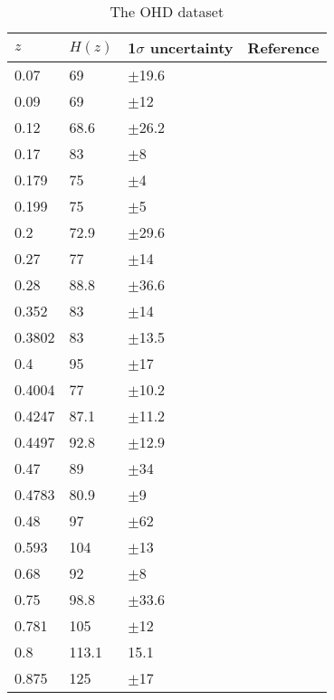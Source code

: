 \documentclass{aa}
\begin{document}
   \begin{table}[htbp]
      \caption{The OHD dataset}
      \centering
      \begin{tabular}{llll}
         \hline\hline
         $z$ & $H(z)$ & 1$\sigma$ uncertainty & Reference \\
         \hline     
         0.07 & 69 & $\pm$19.6 & \cite{Zhang_2014} \\
         0.09 & 69 & $\pm$12 & \cite{PhysRevD.71.123001} \\
         0.12 & 68.6 & $\pm$26.2 & \cite{Zhang_2014} \\
         0.17 & 83 & $\pm$8 & \cite{PhysRevD.71.123001} \\
         0.179 & 75 & $\pm$4 & \cite{M.Moresco_2012} \\
         0.199 & 75 & $\pm$5 & \cite{M.Moresco_2012} \\
         0.2 & 72.9 & $\pm$29.6 & \cite{Zhang_2014} \\
         0.27 & 77 & $\pm$14 & \cite{PhysRevD.71.123001} \\
         0.28 & 88.8 & $\pm$36.6 & \cite{Zhang_2014} \\
         0.352 & 83 & $\pm$14 & \cite{M.Moresco_2012} \\
         0.3802 & 83 & $\pm$13.5 & \cite{Moresco_2016}  \\
         0.4 & 95 & $\pm$17 & \cite{PhysRevD.71.123001} \\
         0.4004 & 77 & $\pm$10.2 & \cite{Moresco_2016} \\
         0.4247 & 87.1 & $\pm$11.2 & \cite{Moresco_2016} \\
         0.4497 & 92.8 & $\pm$12.9 & \cite{Moresco_2016} \\
         0.47 & 89 & $\pm$34 & \cite{10.1093/mnras/stx301} \\
         0.4783 & 80.9 & $\pm$9 & \cite{Moresco_2016} \\
         0.48 & 97 & $\pm$62 & \cite{Daniel.Stern_2010} \\
         0.593 & 104 & $\pm$13 & \cite{M.Moresco_2012} \\
         0.68 & 92 & $\pm$8 & \cite{M.Moresco_2012} \\
         0.75 & 98.8 & $\pm$33.6 & \cite{Borghi_2022} \\
         0.781 & 105 & $\pm$12 & \cite{M.Moresco_2012} \\
         0.8 & 113.1 & 15.1 & \cite{Jiao_2023} \\
         0.875 & 125 & $\pm$17 & \cite{M.Moresco_2012} \\

\end{tabular}
\end{table}
\end{document}
